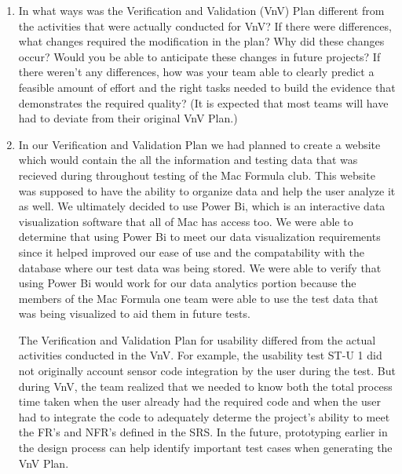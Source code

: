 \documentclass[12pt, titlepage]{article}
\begin{document}
\begin{enumerate}
  \item In what ways was the Verification and Validation (VnV) Plan different
  from the activities that were actually conducted for VnV?  If there were
  differences, what changes required the modification in the plan?  Why did
  these changes occur?  Would you be able to anticipate these changes in future
  projects?  If there weren't any differences, how was your team able to clearly
  predict a feasible amount of effort and the right tasks needed to build the
  evidence that demonstrates the required quality?  (It is expected that most
  teams will have had to deviate from their original VnV Plan.)

  \item In our Verification and Validation Plan we had planned to create a website which would contain the all the information and testing data that was recieved during throughout testing of the Mac Formula club. This website was supposed to have the ability to organize data and help the user analyze it as well. We ultimately decided to use Power Bi, which is an interactive data visualization software that all of Mac has access too. We were able to determine that using Power Bi to meet our data visualization requirements since it helped improved our ease of use and the compatability with the database where our test data was being stored. We were able to verify that using Power Bi would work for our data analytics portion because the members of the Mac Formula one team were able to use the test data that was being visualized to aid them in future tests.


  The Verification and Validation Plan for usability differed from the actual activities conducted in the VnV. For example, the usability test ST-U 1 did not originally account sensor code integration by the user during the test. But during VnV, the team realized that we needed to know both the total process time taken when the user already had the required code and when the user had to integrate the code to adequately determe the project's ability to meet the FR's and NFR's defined in the SRS. In the future, prototyping earlier in the design process can help identify important test cases when generating the VnV Plan. \\


\end{enumerate}
\end{document}
